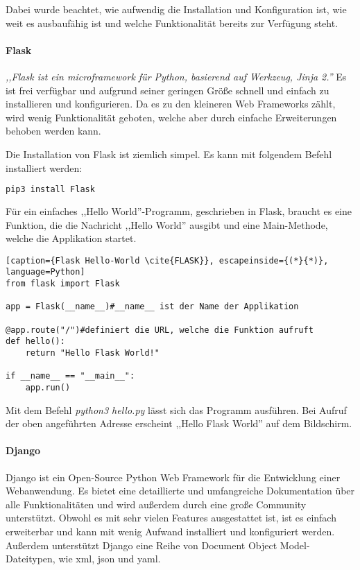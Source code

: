 Dabei wurde beachtet, wie aufwendig die Installation und Konfiguration ist, wie weit es ausbaufähig ist und welche Funktionalität bereits zur Verfügung steht.

\paragraph{Flask}
\textit{,,Flask ist ein microframework für Python, basierend auf Werkzeug, Jinja 2.''}\cite{FLASK} Es ist frei verfügbar und aufgrund seiner geringen Größe schnell und einfach zu installieren und konfigurieren. Da es zu den kleineren Web Frameworks zählt, wird wenig Funktionalität geboten, welche aber durch einfache Erweiterungen behoben werden kann.\cite{FLASK}

Die Installation von Flask ist ziemlich simpel. Es kann mit folgendem Befehl installiert werden:
\begin{lstlisting}[caption={Installation von Flask \cite{FLASK}}, language=bash]
pip3 install Flask
\end{lstlisting}

\newpage

Für ein einfaches ,,Hello World''-Programm, geschrieben in Flask, braucht es eine Funktion, die die Nachricht ,,Hello World'' ausgibt und eine Main-Methode, welche die Applikation startet.

\begin{lstlisting}[caption={Flask Hello-World \cite{FLASK}}, escapeinside={(*}{*)}, language=Python]
from flask import Flask

app = Flask(__name__)#__name__ ist der Name der Applikation

@app.route("/")#definiert die URL, welche die Funktion aufruft
def hello():
	return "Hello Flask World!"

if __name__ == "__main__":
    app.run()
\end{lstlisting}

Mit dem Befehl \textit{python3 hello.py} lässt sich das Programm ausführen. Bei Aufruf der oben angeführten Adresse erscheint ,,Hello Flask World'' auf dem Bildschirm.

\paragraph{Django}
Django ist ein Open-Source Python Web Framework für die Entwicklung einer Webanwendung. Es bietet eine detaillierte und umfangreiche Dokumentation über alle Funktionalitäten und wird außerdem durch eine große Community unterstützt. Obwohl es mit sehr vielen Features ausgestattet ist, ist es einfach erweiterbar und kann mit wenig Aufwand installiert und konfiguriert werden. Außerdem unterstützt Django eine Reihe von Document Object Model-Dateitypen, wie xml, json und yaml. \cite{DJANGO}

